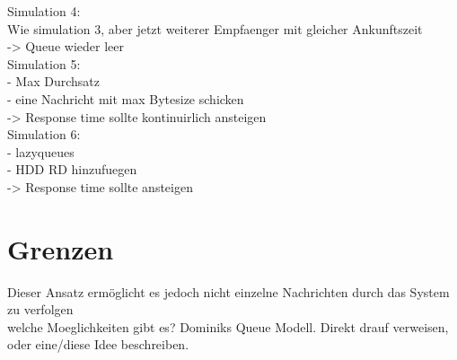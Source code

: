 Simulation 4: \\
Wie simulation 3, aber jetzt weiterer Empfaenger mit gleicher Ankunftszeit \\
-> Queue wieder leer\\

Simulation 5: \\
- Max Durchsatz \\
- eine Nachricht mit max Bytesize schicken \\
-> Response time sollte kontinuirlich ansteigen \\


Simulation 6: \\
- lazyqueues \\
- HDD RD hinzufuegen \\
-> Response time sollte ansteigen \\






\section{Grenzen}
Dieser Ansatz ermöglicht es jedoch nicht einzelne Nachrichten durch das System zu verfolgen\\

welche Moeglichkeiten gibt es? Dominiks Queue Modell. Direkt drauf verweisen, oder eine/diese Idee beschreiben.\\




